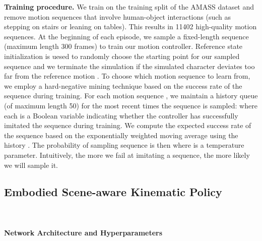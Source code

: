 \noindent \textbf{Training procedure.}
We train on the training split of the AMASS dataset \cite{Mahmood2019AMASSAO} and remove motion sequences that involve human-object interactions (such as stepping on stairs or leaning on tables). This results in 11402 high-quality motion sequences. At the beginning of each episode, we sample a fixed-length sequence (maximum length 300 frames) to train our motion controller. Reference state initialization \cite{Peng2018DeepMimicED} is uesed to randomly choose the starting point for our sampled sequence and we terminate the simulation if the simulated character deviates too far from the reference motion . To choose which motion sequence to learn from, we employ a hard-negative mining technique based on the success rate of the sequence during training. For each motion sequence , we maintain a history queue (of maximum length 50) for the most recent times the sequence is sampled:  where each  is a Boolean variable indicating whether the controller has successfully imitated the sequence during training. We compute the expected success rate  of the sequence based on the exponentially weighted moving average using the history . The probability of sampling sequence  is then  where  is a temperature parameter. Intuitively, the more we fail at imitating a sequence, the more likely we will sample it.

\subsection{Embodied Scene-aware Kinematic Policy}
\begin{table}[b]
\caption{Hyperparameters for our scene-aware kinematic policy.} 
\label{tab:hyper_kin}
\centering
{}\\ 
\end{table}
\paragraph{Network Architecture and Hyperparameters}



